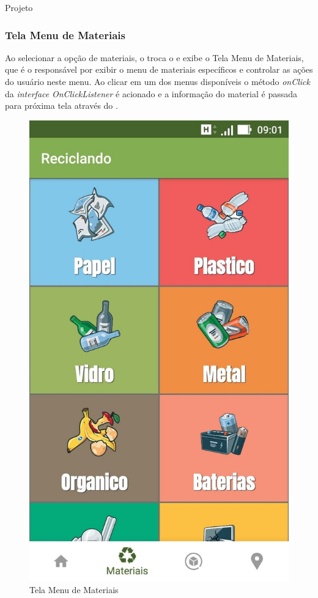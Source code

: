 \documentclass[
	12pt,				%
	openany,			%
	twoside,			%
	a4paper,			%
	english,			%
	french,				%
	spanish,			%
	brazil				%
	]{abntex2}
\begin{document}
\begin{chapter}{Projeto}
\subsubsection{Tela Menu de Materiais} \label{FragmentMaterialMenu}
Ao selecionar a opção de materiais, o  troca o  e exibe o Tela Menu de Materiais, que é o  responsável por exibir o menu de materiais específicos e controlar as ações do usuário neste menu. Ao clicar em um dos menus disponíveis o método \textit{onClick} da \textit{interface} \textit{OnClickListener} é acionado e a informação do material é passada para próxima tela através do .
\
    \begin{figure}[htb]    
 \centering
  \begin{minipage}{0.45\textwidth}
    \centering
    \caption{Tela Menu de Materiais}
    \includegraphics[scale=0.35]{media/tela_menu_material_1.jpg}

\end{minipage}
\end{figure}
\end{chapter}
\end{document}
